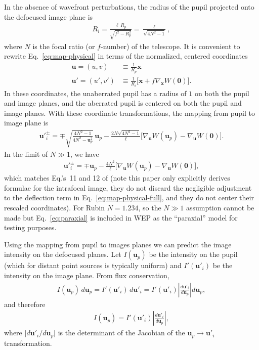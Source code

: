 \documentclass[TS,authoryear,toc]{lsstdoc}
\begin{document}
In the absence of wavefront perturbations, the radius of the pupil projected onto the defocused image plane is
\begin{align}
    R_i = \frac{\ell \, R_p}{\sqrt{f^2 - R_p^2}} = \frac{\ell}{\sqrt{4 N^2 - 1}},
\end{align}
where $N$ is the focal ratio (or $f$-number) of the telescope.
It is convenient to rewrite Eq.~\ref{eq:map-physical} in terms of the normalized, centered coordinates
\begin{align}
    \mathbf{u} = (u, v) &\equiv \frac{1}{R_p} \mathbf{x} \\
    \mathbf{u'} = (u', v') &\equiv \frac{1}{R_i} \Big[ \mathbf{x} + f \nabla_\mathbf{x} W(\mathbf{0}) \Big].
\end{align}
In these coordinates, the unaberrated pupil has a radius of $1$ on both the pupil and image planes, and the aberrated pupil is centered on both the pupil and image planes.
With these coordinate transformations, the mapping from pupil to image plane is
\begin{align}
    \mathbf{u'}_{\!i}^\pm = \mp \sqrt{\frac{4 N^2 - 1}{4 N^2 - \mathbf{u}_p^2}} \, \mathbf{u}_p - \frac{2 N \sqrt{4 N^2 - 1}}{\ell} \Big[ \nabla_\mathbf{u} W(\mathbf{u}_p) - \nabla_\mathbf{u} W(\mathbf{0}) \Big].
    \label{eq:map}
\end{align}
In the limit of $N \gg 1$, we have
\begin{align}
    \mathbf{u'}_{\!i}^\pm = \mp \mathbf{u}_p - \frac{4 N^2}{\ell} \Big[ \nabla_\mathbf{u} W(\mathbf{u}_p) - \nabla_\mathbf{u} W(\mathbf{0}) \Big],
    \label{eq:paraxial}
\end{align}
which matches Eq.'s~11 and 12 of \citet{1993JOSAA..10.2277R} (note this paper only explicitly derives formulae for the intrafocal image, they do not discard the negligible adjustment to the deflection term in Eq.~\ref{eq:map-physical-full}, and they do not center their rescaled coordinates).
For Rubin $N = 1.234$, so the $N \gg 1$ assumption cannot be made but Eq.~\ref{eq:paraxial} is included in WEP as the ``paraxial'' model for testing purposes.

Using the mapping from pupil to images planes we can predict the image intensity on the defocused planes.
Let $I(\mathbf{u}_p)$ be the intensity on the pupil (which for distant point sources is typically uniform) and $I'(\mathbf{u}'_i)$ be the intensity on the image plane.
From flux conservation,
\begin{align}
    I(\mathbf{u}_p) \, d \mathbf{u}_p = 
    I'(\mathbf{u}'_i) \, d \mathbf{u}'_i = 
    I'(\mathbf{u}'_i) \left\vert \frac{d \mathbf{u}'_i}{d \mathbf{u}_p} \right\vert d \mathbf{u}_p,
\end{align}
and therefore
\begin{align}
    I(\mathbf{u}_p) = I'(\mathbf{u}'_i) \left\vert \frac{d \mathbf{u}'_i}{d \mathbf{u}_p} \right\vert,
\end{align}
where $\vert d \mathbf{u}'_i / d \mathbf{u}_p \vert$ is the determinant of the Jacobian of the $\mathbf{u}_p \to \mathbf{u}'_i$ transformation.
\end{document}
